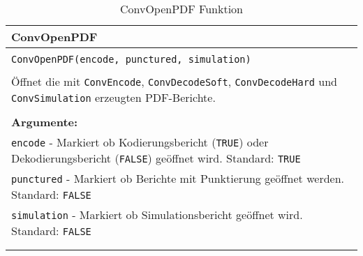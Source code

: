 \begin{longtable}{|p{\textwidth}|}
\hline
\rowcolor{lightblue}
ConvOpenPDF
\\
\hline
\\
\texttt{ConvOpenPDF(encode, punctured, simulation)}\\
\\
Öffnet die mit \texttt{ConvEncode}, \texttt{ConvDecodeSoft}, \texttt{ConvDecodeHard} und \texttt{ConvSimulation} erzeugten PDF-Berichte.\\
\\
\textbf{Argumente:}\\
\texttt{encode} - Markiert ob Kodierungsbericht (\texttt{TRUE}) oder Dekodierungsbericht (\texttt{FALSE}) geöffnet wird. Standard: \texttt{TRUE}\\
\texttt{punctured} - Markiert ob Berichte mit Punktierung geöffnet werden. Standard: \texttt{FALSE}\\
\texttt{simulation} - Markiert ob Simulationsbericht geöffnet wird. Standard: \texttt{FALSE}\\
\\
\hline
\caption{ConvOpenPDF Funktion}
\end{longtable}